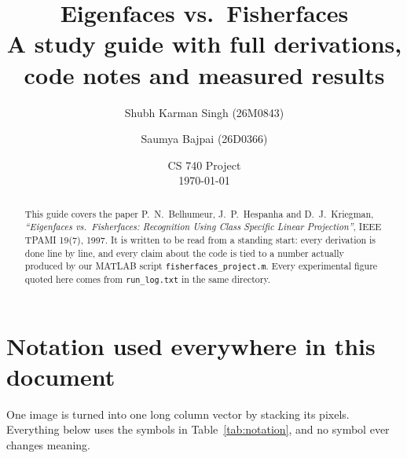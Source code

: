 \documentclass[11pt]{article}
\title{\textbf{Eigenfaces vs.\ Fisherfaces}\\[4pt]
\large A study guide with full derivations, code notes and measured results}
\author{Shubh Karman Singh (26M0843) \and Saumya Bajpai (26D0366)}
\date{CS 740 Project \\ \today}
\theoremstyle{definition}
\theoremstyle{remark}
\begin{document}
\maketitle

\begin{abstract}
\noindent
This guide covers the paper P.~N.~Belhumeur, J.~P.~Hespanha and D.~J.~Kriegman,
\emph{``Eigenfaces vs.\ Fisherfaces: Recognition Using Class Specific Linear
Projection''}, IEEE TPAMI 19(7), 1997. It is written to be read from a standing
start: every derivation is done line by line, and every claim about the code is
tied to a number actually produced by our MATLAB script
\texttt{fisherfaces\_project.m}. Every experimental figure quoted here comes from
\texttt{run\_log.txt} in the same directory.
\end{abstract}

\tableofcontents

\section{Notation used everywhere in this document}

One image is turned into one long column vector by stacking its pixels. Everything
below uses the symbols in Table~\ref{tab:notation}, and no symbol ever changes
meaning.
\end{document}
